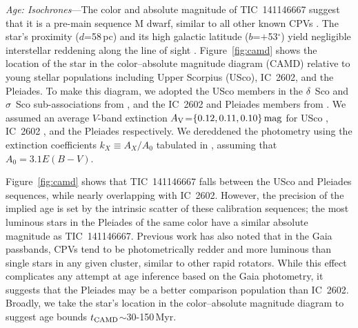 \documentclass{nature3}
\begin{document}
\begin{methods}
{\it Age: Isochrones}---The color and absolute magnitude of
TIC~141146667 suggest that it is a pre-main sequence M dwarf, similar to
all other known CPVs \cite{Stauffer2017,Stauffer2021,Bouma2024}.  The
star's proximity ($d$=58\,pc) and its high galactic latitude
($b$=$+$53$^\circ$) yield negligible interstellar reddening along the
line of sight \cite{Green2019}.  Figure~\ref{fig:camd} shows the
location of the star in the color--absolute magnitude diagram (CAMD)
relative to young stellar populations including Upper Scorpius (USco),
IC~2602, and the Pleiades.  To make this diagram, we adopted the USco
members in the $\delta$~Sco and $\sigma$~Sco sub-associations from
\cite{Ratzenbock2023}, and the IC~2602 and Pleiades members from
\cite{Hunt2024}.  We assumed an average $V$-band extinction $A_{\rm
V}$=$\{0.12, 0.11, 0.10\}\,{\rm mag}$ for USco \cite{Pecaut2016},
IC~2602 \cite{Hunt2024}, and the Pleiades \cite{Hunt2024} respectively.
We dereddened the photometry using the extinction coefficients
$k_X\equiv A_X/A_0$ tabulated in \cite{GaiaCollaboration2018}, assuming
that $A_0 = 3.1 E(B-V)$.

Figure~\ref{fig:camd} shows that TIC~141146667 falls between the USco
and Pleiades sequences, while nearly overlapping with IC~2602.  However,
the precision of the implied age is set by the intrinsic scatter of
these calibration sequences; the most luminous stars in the Pleiades of
the same color have a similar absolute magnitude as TIC~141146667.
Previous work \cite{Stauffer2021} has also noted that in the Gaia
passbands, CPVs tend to be photometrically redder and more luminous than
single stars in any given cluster, similar to other rapid rotators.
While this effect complicates any attempt at age inference based on the
Gaia photometry, it suggests that the Pleiades may be a better
comparison population than IC~2602.  Broadly, we take the star's
location in the color--absolute magnitude diagram to suggest age bounds
$t_{\rm CAMD}$$\sim$30-150\,Myr.



\end{methods}
\end{document}
